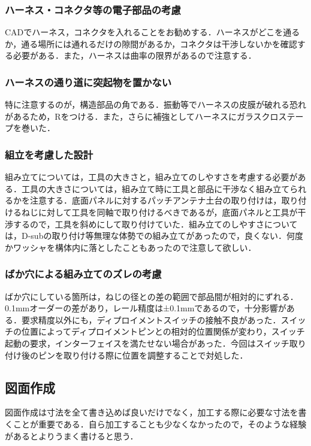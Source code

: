 \subsubsection{ハーネス・コネクタ等の電子部品の考慮}
CADでハーネス，コネクタを入れることをお勧めする．ハーネスがどこを通るか，通る場所には通れるだけの隙間があるか，コネクタは干渉しないかを確認する必要がある．また，ハーネスは曲率の限界があるので注意する．
\subsubsection{ハーネスの通り道に突起物を置かない}
特に注意するのが，構造部品の角である．振動等でハーネスの皮膜が破れる恐れがあるため，Rをつける．また，さらに補強としてハーネスにガラスクロステープを巻いた．
\subsubsection{組立を考慮した設計}
組み立てについては，工具の大きさと，組み立てのしやすさを考慮する必要がある．工具の大きさについては，組み立て時に工具と部品に干渉なく組み立てられるかを注意する．底面パネルに対するパッチアンテナ土台の取り付けは，取り付けるねじに対して工具を同軸で取り付けるべきであるが，底面パネルと工具が干渉するので，工具を斜めにして取り付けていた．組み立てのしやすさについては，D-subの取り付け等無理な体勢での組み立てがあったので，良くない．何度かワッシャを構体内に落としたこともあったので注意して欲しい．
\subsubsection{ばか穴による組み立てのズレの考慮}
ばか穴にしている箇所は，ねじの径との差の範囲で部品間が相対的にずれる．0.1mmオーダーの差があり，レール精度は±0.1mmであるので，十分影響がある．要求精度以外にも，ディプロイメントスイッチの接触不良があった．スイッチの位置によってディプロイメントピンとの相対的位置関係が変わり，スイッチ起動の要求，インターフェイスを満たせない場合があった．今回はスイッチ取り付け後のピンを取り付ける際に位置を調整することで対処した．


\subsection{図面作成}
図面作成は寸法を全て書き込めば良いだけでなく，加工する際に必要な寸法を書くことが重要である．自ら加工することも少なくなかったので，そのような経験があるとよりうまく書けると思う．

